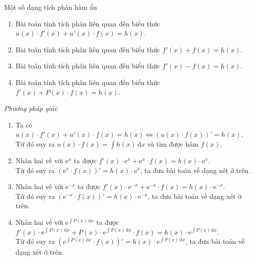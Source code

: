 \begin{dang}{Một số dạng tích phân hàm ẩn}
\begin{enumerate}
\item Bài toán tính tích phân liên quan đến biểu thức $u(x)\cdot f'(x)+u'(x)\cdot f(x)=h(x)$.\\
\item Bài toán tính tích phân liên quan đến biểu thức $f'(x)+f(x)=h(x)$.\\
\item Bài toán tính tích phân liên quan đến biểu thức $f'(x)-f(x)=h(x)$.
\item Bài toán tính tích phân liên quan đến biểu thức $f'(x)+P(x)\cdot f(x)=h(x)$.
\end{enumerate}
\emph{Phương pháp giải}:
\begin{enumerate}
\item Ta có $u(x)\cdot f'(x)+u'(x)\cdot f(x)=h(x)\Leftrightarrow \left(u(x)\cdot f(x)\right)'=h(x)$.\\
Từ đó suy ra $u(x)\cdot f(x)=\displaystyle\int h(x)\mathrm{\,d}x$ và tìm được hàm $f(x)$.
\item Nhân hai vế với $\mathrm{e}^x$ ta được $f'(x)\cdot \mathrm{e}^x+\mathrm{e}^x\cdot f(x)=h(x)\cdot \mathrm{e}^x$.\\
Từ đó suy ra $\left(\mathrm{e}^x\cdot f(x)\right)'=h(x)\cdot \mathrm{e}^x$, ta đưa bài toán về dạng xét ở trên.
\item Nhân hai vế với $\mathrm{e}^{-x}$ ta được $f'(x)\cdot \mathrm{e}^{-x}+\mathrm{e}^{-x}\cdot f(x)=h(x)\cdot \mathrm{e}^{-x}$.\\
Từ đó suy ra $\left(\mathrm{e}^{-x}\cdot f(x)\right)'=h(x)\cdot \mathrm{e}^{-x}$, ta đưa bài toán về dạng xét ở trên.
\item Nhân hai vế với $\mathrm{e}^{\int P(x)\mathrm{\,d}x}$ ta được $f'(x)\cdot \mathrm{e}^{\int P(x)\mathrm{\,d}x}+P(x)\cdot \mathrm{e}^{\int P(x)\mathrm{\,d}x}\cdot f(x)=h(x)\cdot \mathrm{e}^{\int P(x)\mathrm{\,d}x}$.\\
Từ đó suy ra $\left(\mathrm{e}^{\int P(x)\mathrm{\,d}x}\cdot f(x)\right)'=h(x)\cdot \mathrm{e}^{\int P(x)\mathrm{\,d}x}$, ta đưa bài toán về dạng xét ở trên.
\end{enumerate}
\end{dang}

